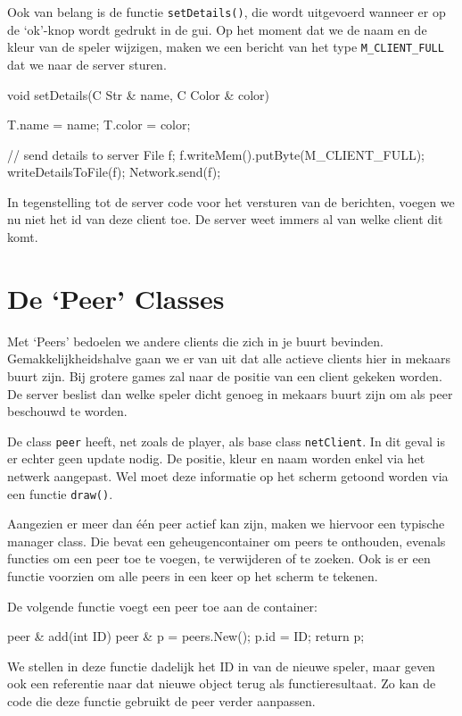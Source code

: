 Ook van belang is de functie \texttt{setDetails()}, die wordt uitgevoerd wanneer er op de `ok'-knop wordt gedrukt in de gui. Op het moment dat we de naam en de kleur van de speler wijzigen, maken we een bericht van het type \texttt{M\_CLIENT\_FULL} dat we naar de server sturen.

\begin{code}
void setDetails(C Str & name, C Color & color)
{
	T.name = name;
	T.color = color;
	
	// send details to server
	File f;
	f.writeMem().putByte(M_CLIENT_FULL);
	writeDetailsToFile(f);
	Network.send(f);
}
\end{code}

\begin{note}
In tegenstelling tot de server code voor het versturen van de berichten, voegen we nu niet het id van deze client toe. De server weet immers al van welke client dit komt.
\end{note}

\section{De `Peer' Classes}
Met `Peers' bedoelen we andere clients die zich in je buurt bevinden. Gemakkelijkheidshalve gaan we er van uit dat alle actieve clients hier in mekaars buurt zijn. Bij grotere games zal naar de positie van een client gekeken worden. De server beslist dan welke speler dicht genoeg in mekaars buurt zijn om als peer beschouwd te worden.

De class \texttt{peer} heeft, net zoals de player, als base class \texttt{netClient}. In dit geval is er echter geen update nodig. De positie, kleur en naam worden enkel via het netwerk aangepast. Wel moet deze informatie op het scherm getoond worden via een functie \texttt{draw()}.

Aangezien er meer dan \'e\'en peer actief kan zijn, maken we hiervoor een typische manager class. Die bevat een geheugencontainer om peers te onthouden, evenals functies om een peer toe te voegen, te verwijderen of te zoeken. Ook is er een functie voorzien om alle peers in een keer op het scherm te tekenen.

De volgende functie voegt een peer toe aan de container:

\begin{code}
peer & add(int ID)
{
	peer & p = peers.New();
	p.id = ID;
	return p;
}
\end{code}

We stellen in deze functie dadelijk het ID in van de nieuwe speler, maar geven ook een referentie naar dat nieuwe object terug als functieresultaat. Zo kan de code die deze functie gebruikt de peer verder aanpassen.

